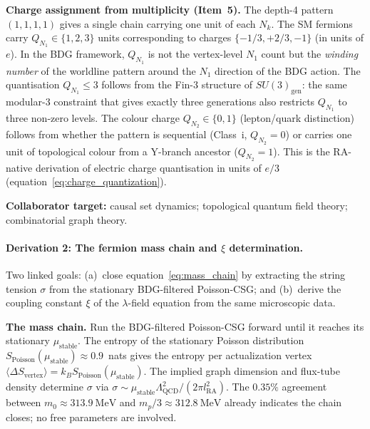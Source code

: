 \documentclass[11pt,a4paper]{article}
\begin{document}
\textbf{Charge assignment from multiplicity (Item~5).}
The depth-4 pattern $(1,1,1,1)$ gives a single chain carrying one unit of
each $N_k$. The SM fermions carry $Q_{N_1} \in \{1,2,3\}$ units corresponding
to charges $\{-1/3, +2/3, -1\}$ (in units of $e$). In the BDG framework,
$Q_{N_1}$ is not the vertex-level $N_1$ count but the \emph{winding number}
of the worldline pattern around the $N_1$ direction of the BDG action. The
quantisation $Q_{N_1} \leq 3$ follows from the Fin-3 structure of
$SU(3)_{\mathrm{gen}}$: the same modular-3 constraint that gives exactly
three generations also restricts $Q_{N_1}$ to three non-zero levels.
The colour charge $Q_{N_2} \in \{0,1\}$ (lepton/quark distinction) follows
from whether the pattern is sequential (Class~i, $Q_{N_2}=0$) or carries
one unit of topological colour from a Y-branch ancestor ($Q_{N_2}=1$).
This is the RA-native derivation of electric charge quantisation in
units of $e/3$ (equation~\eqref{eq:charge_quantization}).

\textbf{Collaborator target:} causal set dynamics; topological quantum field theory;
combinatorial graph theory.

\paragraph{Derivation 2: The fermion mass chain and $\xi$ determination.}
Two linked goals: (a)~close equation~\eqref{eq:mass_chain} by extracting the
string tension $\sigma$ from the stationary BDG-filtered Poisson-CSG; and
(b)~derive the coupling constant $\xi$ of the $\lambda$-field equation from
the same microscopic data.

\textbf{The mass chain.}
Run the BDG-filtered Poisson-CSG forward until it reaches its stationary
$\mu_{\mathrm{stable}}$. The entropy of the stationary Poisson distribution
$S_{\mathrm{Poisson}}(\mu_{\mathrm{stable}}) \approx 0.9$~nats gives the
entropy per actualization vertex $\langle\Delta S_{\mathrm{vertex}}\rangle
= k_B S_{\mathrm{Poisson}}(\mu_{\mathrm{stable}})$.
The implied graph dimension and flux-tube density determine $\sigma$ via
$\sigma \sim \mu_{\mathrm{stable}} \Lambda_{\mathrm{QCD}}^2 / (2\pi l_{\mathrm{RA}}^2)$.
The $0.35\%$ agreement between $m_0 \approx 313.9~\mathrm{MeV}$ and
$m_p/3 \approx 312.8~\mathrm{MeV}$ already indicates the chain closes;
no free parameters are involved.
\end{document}
